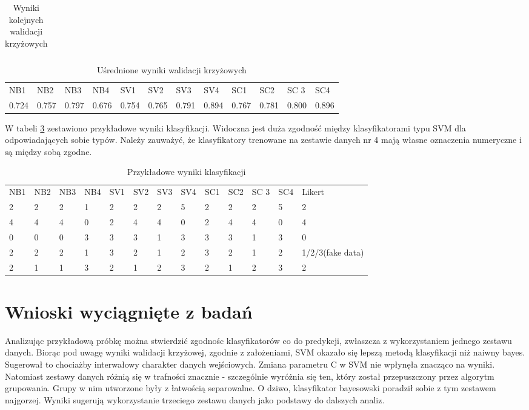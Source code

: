 \documentclass[12pt,a4paper,oneside]{report} %
\begin{document}
\begin{table}
\begin{tabular}{l|l|l|l|l|l|l|l|l|l|l}
\hline
\end{tabular}
\caption{Wyniki kolejnych walidacji krzyżowych}
\label{cross-val-tab}
\end{table}

\begin{table}
\begin{tabular}{l|l|l|l|l|l|l|l|l|l|l|l}
\hline
NB1 & NB2 & NB3 & NB4 & SV1 & SV2 & SV3 & SV4 & SC1 & SC2 & SC 3 & SC4 \\
    0.724 & 0.757 & 0.797 & 0.676 & 0.754 & 0.765 & 0.791 & 0.894 & 0.767 & 0.781 & 0.800 & 0.896 \\
\hline
\end{tabular}
\caption{Uśrednione wyniki walidacji krzyżowych}
\label{cross-val-tab-av}
\end{table}

W tabeli \ref{sample-out} zestawiono przykładowe wyniki klasyfikacji. Widoczna jest duża zgodność między klasyfikatorami typu SVM dla odpowiadających sobie typów. Należy zauważyć, że klasyfikatory trenowane na zestawie danych nr 4 mają własne oznaczenia numeryczne i są między sobą zgodne.

\begin{table}
\begin{tabular}{l|l|l|l|l|l|l|l|l|l|l|l|l}
\hline
NB1 & NB2 & NB3 & NB4 & SV1 & SV2 & SV3 & SV4 & SC1 & SC2 & SC 3 & SC4 & Likert \\
2 & 2 & 2 & 1 & 2 & 2 & 2 & 5 & 2 & 2 & 2 & 5 & 2 \\ 
4 & 4 & 4 & 0 & 2 & 4 & 4 & 0 & 2 & 4 & 4 & 0 & 4 \\ 
0 & 0 & 0 & 3 & 3 & 3 & 1 & 3 & 3 & 3 & 1 & 3 & 0 \\ 
2 & 2 & 2 & 1 & 3 & 2 & 1 & 2 & 3 & 2 & 1 & 2 & 1/2/3(fake data) \\ 
2 & 1 & 1 & 3 & 2 & 1 & 2 & 3 & 2 & 1 & 2 & 3 & 2 \\ 
\hline
\end{tabular}
\caption{Przykładowe wyniki klasyfikacji}
\label{sample-out}
\end{table}

\section{Wnioski wyciągnięte z badań}

Analizując przykładową próbkę można stwierdzić zgodnośc klasyfikatorów co do predykcji, zwłaszcza z wykorzystaniem jednego zestawu danych. Biorąc pod uwagę wyniki walidacji krzyżowej, zgodnie z założeniami, SVM okazało się lepszą metodą klasyfikacji niż naiwny bayes. Sugerował to chociażby interwałowy charakter danych wejściowych. Zmiana parametru C w SVM nie wpłynęła znacząco na wyniki. Natomiast zestawy danych różnią się w trafności znacznie - szczególnie wyróżnia się ten, który został przepuszczony przez algorytm grupowania. Grupy w nim utworzone były z łatwością separowalne. O dziwo, klasyfikator bayesowski poradził sobie z tym zestawem najgorzej. Wyniki sugerują wykorzystanie trzeciego zestawu danych jako podstawy do dalszych analiz. \par
\end{document}
